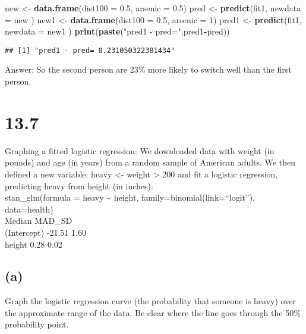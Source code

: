 \documentclass[
]{article}
\newenvironment{Shaded}{\begin{snugshade}}{\end{snugshade}}
\newcommand{\DataTypeTok}[1]{\textcolor[rgb]{0.13,0.29,0.53}{#1}}
\newcommand{\DecValTok}[1]{\textcolor[rgb]{0.00,0.00,0.81}{#1}}
\newcommand{\FloatTok}[1]{\textcolor[rgb]{0.00,0.00,0.81}{#1}}
\newcommand{\KeywordTok}[1]{\textcolor[rgb]{0.13,0.29,0.53}{\textbf{#1}}}
\newcommand{\NormalTok}[1]{#1}
\newcommand{\OperatorTok}[1]{\textcolor[rgb]{0.81,0.36,0.00}{\textbf{#1}}}
\newcommand{\StringTok}[1]{\textcolor[rgb]{0.31,0.60,0.02}{#1}}
\begin{document}
\begin{Shaded}
\begin{Highlighting}[]
\NormalTok{new <-}\StringTok{ }\KeywordTok{data.frame}\NormalTok{(}\DataTypeTok{dist100 =} \FloatTok{0.5}\NormalTok{, }\DataTypeTok{arsenic =} \FloatTok{0.5}\NormalTok{)}
\NormalTok{pred <-}\StringTok{ }\KeywordTok{predict}\NormalTok{(fit1, }\DataTypeTok{newdata =}\NormalTok{ new )}
\NormalTok{new1 <-}\StringTok{ }\KeywordTok{data.frame}\NormalTok{(}\DataTypeTok{dist100 =} \FloatTok{0.5}\NormalTok{, }\DataTypeTok{arsenic =} \DecValTok{1}\NormalTok{)}
\NormalTok{pred1 <-}\StringTok{ }\KeywordTok{predict}\NormalTok{(fit1, }\DataTypeTok{newdata =}\NormalTok{ new1 )}
\KeywordTok{print}\NormalTok{(}\KeywordTok{paste}\NormalTok{(}\StringTok{"pred1 - pred="}\NormalTok{,pred1}\OperatorTok{-}\NormalTok{pred))}
\end{Highlighting}
\end{Shaded}

\begin{verbatim}
## [1] "pred1 - pred= 0.231050322381434"
\end{verbatim}

Answer: So the second person are 23\% more likely to switch well than
the first person.

\hypertarget{section-1}{%
\section{13.7}\label{section-1}}

Graphing a fitted logistic regression: We downloaded data with weight
(in pounds) and age (in years) from a random sample of American adults.
We then defined a new variable: heavy \textless- weight \textgreater{}
200 and fit a logistic regression, predicting heavy from height (in
inches):\\
stan\_glm(formula = heavy \textasciitilde{} height,
family=binomial(link=``logit''), data=health)\\
Median MAD\_SD\\
(Intercept) -21.51 1.60\\
height 0.28 0.02

\hypertarget{a-1}{%
\subsection{(a)}\label{a-1}}

Graph the logistic regression curve (the probability that someone is
heavy) over the approximate range of the data. Be clear where the line
goes through the 50\% probability point.
\end{document}
